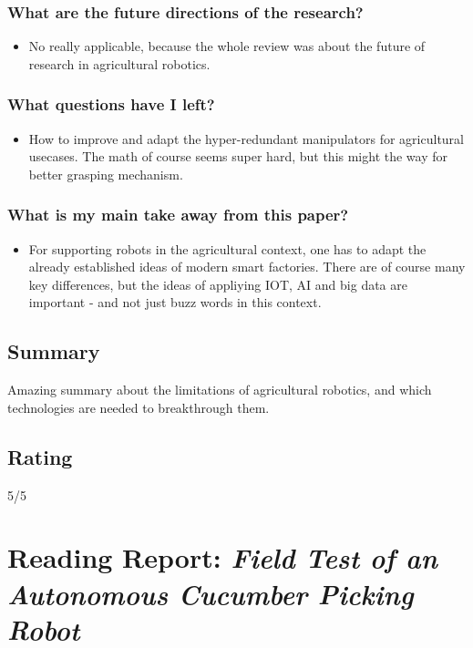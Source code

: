 \subsubsection*{What are the future directions of the research?}
\begin{itemize}
    \item No really applicable, because the whole review was about the future of research in agricultural robotics.
\end{itemize}
\subsubsection*{What questions have I left?}
\begin{itemize}
    \item How to improve and adapt the hyper-redundant manipulators for agricultural usecases. The math of course seems super hard, but this might the way for better grasping mechanism.
\end{itemize}
\subsubsection*{What is my main take away from this paper?}
\begin{itemize}
    \item For supporting robots in the agricultural context, one has to adapt the already established ideas of modern smart factories. There are of course many key differences, but the ideas of appliying IOT, AI and big data are important  - and not just buzz words in this context.
\end{itemize}

\subsection*{Summary}
Amazing summary about the limitations of agricultural robotics, and which technologies are needed to breakthrough them.

\subsection*{Rating}
5/5


\section{Reading Report: \emph{Field Test of an Autonomous Cucumber Picking Robot}}
\cite{Henten2003}

